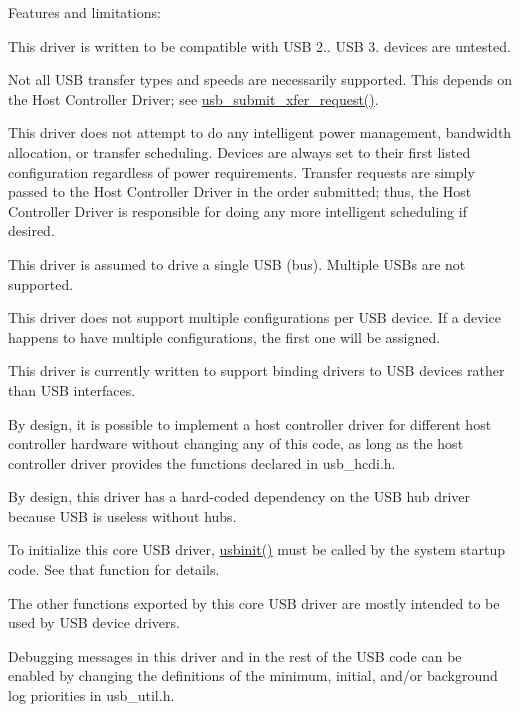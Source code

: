 Features and limitations\-:


\begin{DoxyItemize}
\item This driver is written to be compatible with U\-S\-B 2.. U\-S\-B 3. devices are untested.
\item Not all U\-S\-B transfer types and speeds are necessarily supported. This depends on the Host Controller Driver; see \hyperlink{group__usbcore_ga873be6d448b1c95c51cb5600a197cf64}{usb\-\_\-submit\-\_\-xfer\-\_\-request()}.
\item This driver does not attempt to do any intelligent power management, bandwidth allocation, or transfer scheduling. Devices are always set to their first listed configuration regardless of power requirements. Transfer requests are simply passed to the Host Controller Driver in the order submitted; thus, the Host Controller Driver is responsible for doing any more intelligent scheduling if desired.
\item This driver is assumed to drive a single U\-S\-B (bus). Multiple U\-S\-Bs are not supported.
\item This driver does not support multiple configurations per U\-S\-B device. If a device happens to have multiple configurations, the first one will be assigned.
\item This driver is currently written to support binding drivers to U\-S\-B devices rather than U\-S\-B interfaces.
\item By design, it is possible to implement a host controller driver for different host controller hardware without changing any of this code, as long as the host controller driver provides the functions declared in usb\-\_\-hcdi.\-h.
\item By design, this driver has a hard-\/coded dependency on the U\-S\-B hub driver because U\-S\-B is useless without hubs.
\end{DoxyItemize}

To initialize this core U\-S\-B driver, \hyperlink{group__usb_ga44a089d3d6c6297f5880f14eeb1d6397}{usbinit()} must be called by the system startup code. See that function for details.

The other functions exported by this core U\-S\-B driver are mostly intended to be used by U\-S\-B device drivers.

Debugging messages in this driver and in the rest of the U\-S\-B code can be enabled by changing the definitions of the minimum, initial, and/or background log priorities in usb\-\_\-util.\-h. 


